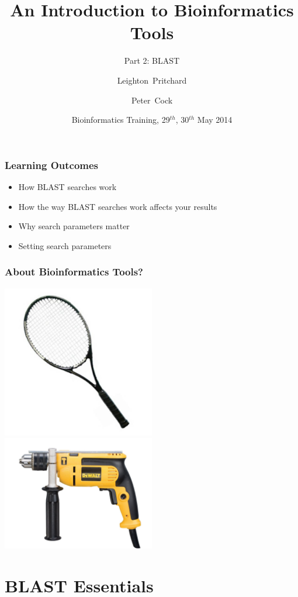 \documentclass[table]{beamer}
\title[Intro to Bioinformatics] %
{An Introduction to Bioinformatics Tools}
\subtitle{Part 2: BLAST}
\author[Pritchard, Cock] %
{Leighton~Pritchard \and Peter~Cock}
\institute[The James Hutton Institute] %
{
  Information and Computational Sciences\\
  The James Hutton Institute
}
\date[May 2014] %
{Bioinformatics Training, 29$^{th}$, 30$^{th}$ May 2014}
\begin{document}
  \frame[plain]{\titlepage}
  
    \begin{frame}
     \frametitle{Learning Outcomes}
     \begin{itemize}
       \item How BLAST searches work
       \item How the way BLAST searches work affects your results
       \item Why search parameters matter
       \item Setting search parameters
     \end{itemize}
    \end{frame}    
  
    \begin{frame}
     \frametitle{About Bioinformatics Tools?}
     \begin{center}
      \includegraphics[width=0.5\textwidth]{images/racquet} 
      \includegraphics[width=0.5\textwidth]{images/drill}       
     \end{center}
    \end{frame}      
  
  \section{BLAST Essentials} 
\end{document}
